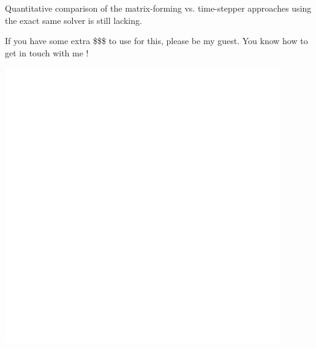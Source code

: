 \documentclass[aspectratio=169, usenames, dvipsnames]{beamer}
\begin{document}
\begin{frame}
  \vfill
  \begin{minipage}{.68\textwidth}
    Quantitative comparison of the matrix-forming vs. time-stepper approaches using the exact same solver is still lacking.

    \bigskip

    If you have some extra \$\$\$ to use for this, please be my guest.
    You know how to get in touch with me !
  \end{minipage}%
  \hfill
  \begin{minipage}{.28\textwidth}
    \centering
    \includegraphics[width=\textwidth]{question}
  \end{minipage}
  \vfill
\end{frame}
  
\end{document}
